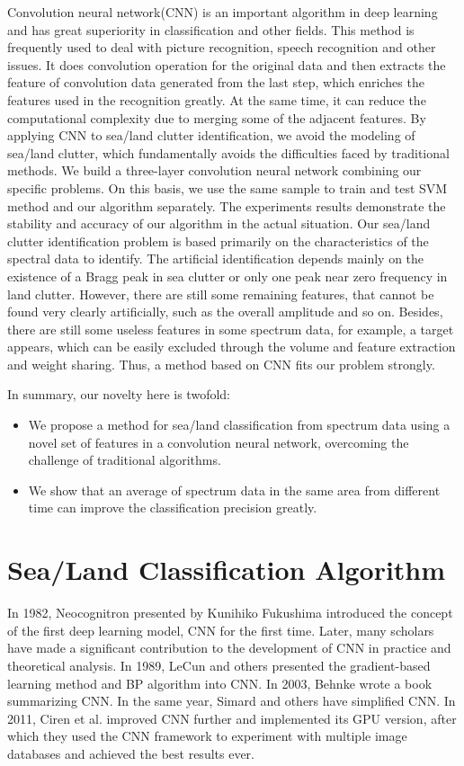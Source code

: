 Convolution neural network(CNN) is an important algorithm in deep learning and has great superiority in classification and other fields. This method is frequently used to deal with picture recognition, speech recognition and other issues. It does convolution operation for the original data and then extracts the feature of convolution data generated from the last step, which enriches the features used in the recognition greatly. At the same time, it can reduce the computational complexity due to merging some of the adjacent features. By applying CNN to sea/land clutter identification, we avoid the modeling of sea/land clutter, which fundamentally avoids the difficulties faced by traditional methods. We build a three-layer convolution neural network combining our specific problems. On this basis, we use the same sample to train and test SVM method and our algorithm separately. The experiments results demonstrate the stability and accuracy of our algorithm in the actual situation. Our sea/land clutter identification problem is based primarily on the characteristics of the spectral data to identify. The artificial identification depends mainly on the existence of a Bragg peak in sea clutter or only one peak near zero frequency in land clutter. However, there are still some remaining features, that cannot be found very clearly artificially, such as the overall amplitude and so on. Besides, there are still some useless features in some spectrum data, for example, a target appears, which can be easily excluded through the volume and feature extraction and weight sharing. Thus, a method based on CNN fits our problem strongly.

In summary, our novelty here is twofold:
\begin{itemize}
	\item We propose a method for sea/land classification from spectrum data using a novel set of features in a convolution neural network, overcoming the challenge of traditional algorithms.
	\item We show that an average of spectrum data in  the same area from different time can improve the classification precision greatly.
\end{itemize}

\section{Sea/Land Classification Algorithm}

In 1982, Neocognitron presented by Kunihiko Fukushima\cite{fukushima1982neocognitron} introduced the concept of the first deep learning model, CNN for the first time. Later, many scholars have made a significant contribution to the development of CNN in practice and theoretical analysis. In 1989, LeCun and others presented the gradient-based learning method\cite{lecun1998gradient} and BP algorithm\cite{lecun1989backpropagation} into CNN. In 2003, Behnke wrote a book summarizing CNN\cite{behnke2003hierarchical}. In the same year, Simard and others have simplified CNN\cite{simard2003best}. In 2011, Ciren et al. improved CNN further and implemented its GPU version\cite{ciresan2011flexible}, after which they used the CNN framework to experiment with multiple image databases and achieved the best results ever.

